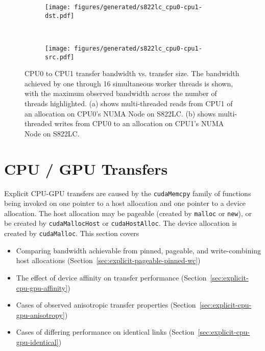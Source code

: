\begin{figure}[ht]
    \centering
    \begin{subfigure}[b]{0.3\textwidth}
        \texttt{[image: figures/generated/s822lc\_cpu0-cpu1-dst.pdf]}
        \caption{}
        \label{fig:s822lc-cpu0-cpu1}
    \end{subfigure}
    ~
    \begin{subfigure}[b]{0.3\textwidth}
        \texttt{[image: figures/generated/s822lc\_cpu0-cpu1-src.pdf]}
        \caption{}
        \label{fig:s822lc-cpu0-cpu1}
    \end{subfigure}
    \caption[]{
        CPU0 to CPU1 transfer bandwidth vs. transfer size.
        The bandwidth achieved by one through 16 simultaneous worker threads is shown, with the maximum observed bandwidth across the number of threads highlighted.
        (a) shows multi-threaded reads from CPU1 of an allocation on CPU0's NUMA Node on S822LC.
        (b) shows multi-threaded writes from CPU0 to an allocation on CPU1's NUMA Node on S822LC.
    }
    \label{fig:cpu0-cpu1}
\end{figure}



\section{CPU / GPU Transfers}
\label{sec:explicit-cpu-gpu}

Explicit CPU-GPU transfers are caused by the \texttt{cudaMemcpy} family of functions being invoked on one pointer to a host allocation and one pointer to a device allocation.
The host allocation may be pageable (created by \texttt{malloc} or \texttt{new}), or be created by \texttt{cudaMallocHost} or \texttt{cudaHostAlloc}.
The device allocation is created by \texttt{cudaMalloc}.
This section covers
\begin{itemize}
\item Comparing bandwidth achievable from pinned, pageable, and write-combining host allocations (Section~\ref{sec:explicit-pageable-pinned-wc})
\item The effect of device affinity on transfer performance (Section~\ref{sec:explicit-cpu-gpu-affinity})
\item Cases of observed anisotropic transfer properties (Section~\ref{sec:explicit-cpu-gpu-anisotropy})
\item Cases of differing performance on identical links (Section~\ref{sec:explicit-cpu-gpu-identical})
\end{itemize}

